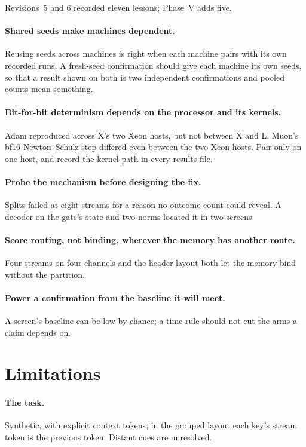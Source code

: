 \documentclass[11pt]{article}
\begin{document}
Revisions~5 and 6 recorded eleven lessons; Phase~V adds five.

\paragraph{Shared seeds make machines dependent.} Reusing seeds across machines is right when each machine pairs with its own recorded runs. A fresh-seed confirmation should give each machine its own seeds, so that a result shown on both is two independent confirmations and pooled counts mean something.

\paragraph{Bit-for-bit determinism depends on the processor and its kernels.} Adam reproduced across X's two Xeon hosts, but not between X and L. Muon's bf16 Newton--Schulz step differed even between the two Xeon hosts. Pair only on one host, and record the kernel path in every results file.

\paragraph{Probe the mechanism before designing the fix.} Splits failed at eight streams for a reason no outcome count could reveal. A decoder on the gate's state and two norms located it in two screens.

\paragraph{Score routing, not binding, wherever the memory has another route.} Four streams on four channels and the header layout both let the memory bind without the partition.

\paragraph{Power a confirmation from the baseline it will meet.} A screen's baseline can be low by chance; a time rule should not cut the arms a claim depends on.

\section{Limitations}

\paragraph{The task.} Synthetic, with explicit context tokens; in the grouped layout each key's stream token is the previous token. Distant cues are unresolved.
\end{document}
